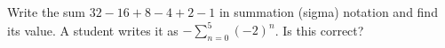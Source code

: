 Write the sum $32-16+8-4+2-1$ in summation (sigma) notation and find its value. A student writes it as $-\displaystyle\sum_{n=0}^{5}(-2)^n$. Is this correct?
